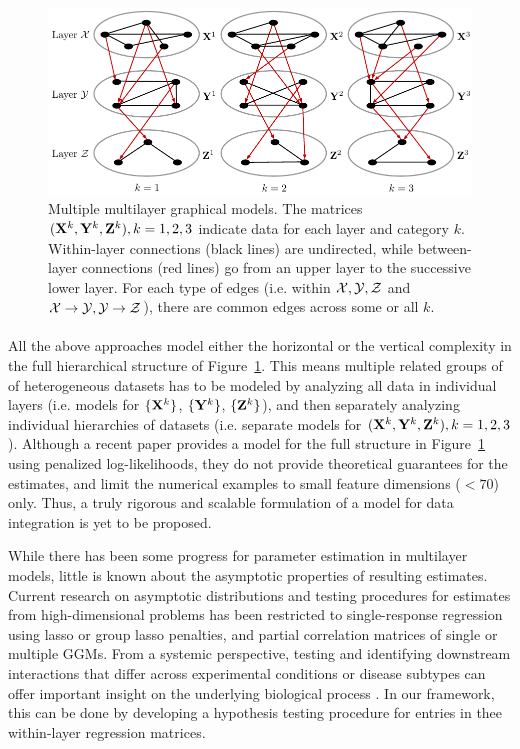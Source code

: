 \begin{figure}
\centering
\includegraphics[]{multi2layer}
\caption{Multiple multilayer graphical models. The matrices $({\mathbf{X}}^k, {\mathbf{Y}}^k, {\mathbf{Z}}^k), k = 1,2,3$ indicate data for each layer and category $k$. Within-layer connections (black lines) are undirected, while between-layer connections (red lines) go from an upper layer to the successive lower layer. For each type of edges (i.e. within ${\cal{X}}, {\cal{Y}}, {\cal{Z}}$ and ${\cal{X}} \rightarrow {\cal{Y}}, {\cal{Y}} \rightarrow {\cal{Z}}$), there are common edges across some or all $k$. }
\label{fig:multi2layer}
\end{figure}

\paragraph{}
All the above approaches model either the horizontal or the vertical complexity in the full hierarchical structure of Figure~\ref{fig:multi2layer}. This means multiple related groups of of heterogeneous datasets has to be modeled by analyzing all data in individual layers (i.e. models for $\{ {\mathbf{X}}^k \}$, $\{ {\mathbf{Y}}^k \}$, $\{ {\mathbf{Z}}^k \}$), and then separately analyzing individual hierarchies of datasets (i.e. separate models for $({\mathbf{X}}^k, {\mathbf{Y}}^k, {\mathbf{Z}}^k), k = 1,2,3$). Although a recent paper \citep{ZhangOuyangZhao17} provides a model for the full structure in Figure~\ref{fig:multi2layer} using penalized log-likelihoods, they do not provide theoretical guarantees for the estimates, and limit the numerical examples to small feature dimensions ($<70$) only. Thus, a truly rigorous and scalable formulation of a model for data integration is yet to be proposed.

While there has been some progress for parameter estimation in multilayer models, little is known about the asymptotic properties of resulting estimates. Current research on asymptotic distributions and testing procedures for estimates from high-dimensional problems has been restricted to single-response regression using lasso \citep{ZhangZhang14,JavanmardMontanari14,JavanmardMontanari18,vanDeGeerEtal14} or group lasso \citep{MitraZhang16} penalties, and partial correlation matrices of single \citep{CaiLiu16} or multiple \citep{Liu17} GGMs. From a systemic perspective, testing and identifying downstream interactions that differ across experimental conditions or disease subtypes can offer important insight on the underlying biological process \citep{MaoEtal17,LiEtal15}. In our framework, this can be done by developing a hypothesis testing procedure for entries in thee within-layer regression matrices.

